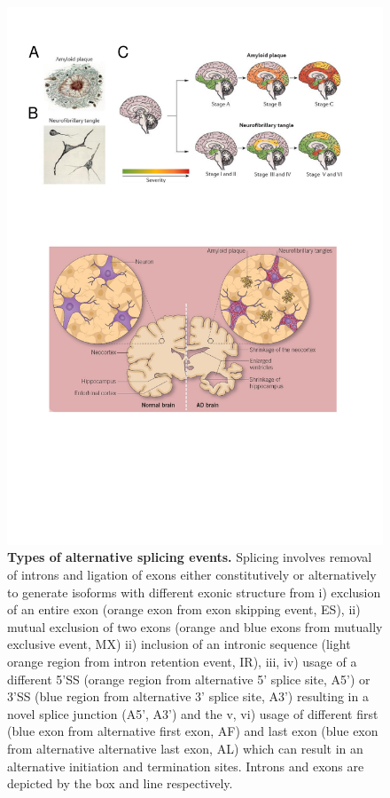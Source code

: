 \begin{figure}[!ht]
	\centering
	\includegraphics[page=9,trim={0 16cm 0cm 0},clip, scale = 0.7]{Figures/Introduction_Figures.pdf}
	\captionsetup{width=0.95\textwidth,singlelinecheck=off}
	\caption[Types of alternative splicing events]%
	{\textbf{Types of alternative splicing events.} Splicing involves removal of introns and ligation of exons either constitutively or alternatively to generate isoforms with different exonic structure from i) exclusion of an entire exon (orange exon from exon skipping event, ES), ii) mutual exclusion of two exons (orange and blue exons from mutually exclusive event, MX) ii) inclusion of an intronic sequence (light orange region from intron retention event, IR), iii, iv) usage of a different 5'SS (orange region from alternative 5' splice site, A5') or 3'SS (blue region from alternative 3' splice site, A3') resulting in a novel splice junction (A5', A3') and the v, vi) usage of different first (blue exon from alternative first exon, AF) and last exon (blue exon from alternative alternative last exon, AL) which can result in an alternative initiation and termination sites. Introns and exons are depicted by the box and line respectively. 
	}
	\label{fig:AS_events}
\end{figure}


